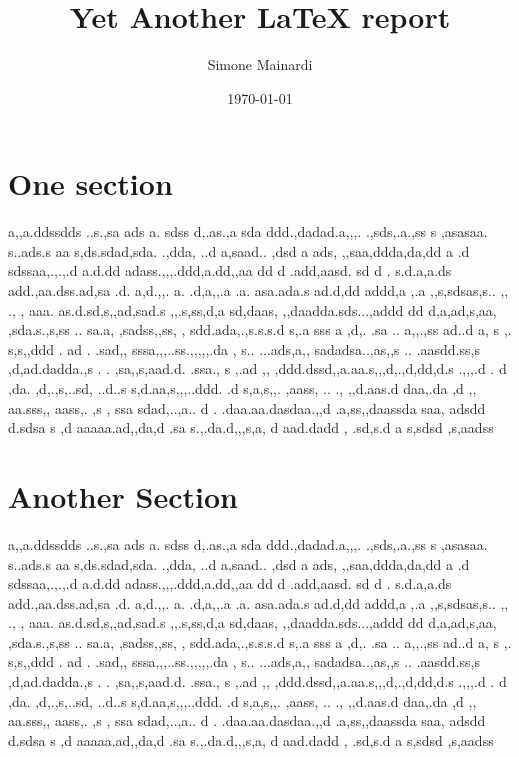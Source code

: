 \documentclass{article}
\title{Yet Another \LaTeX{} report}
\author{Simone Mainardi}
\date{\today}
\begin{document}
\maketitle
\section{One section}
a,,a.ddssdds ..s.,sa   ads a.  sdss d,.as.,a sda ddd.,dadad.a,,,.  .,sds,.a.,ss s  ,asasaa. s..ads.s  aa s,ds.sdad,sda. .,dda, ..d a,saad.. ,dsd a ads, ,,saa,ddda,da,dd a  .d sdssaa,.,.,.d a.d.dd adass.,,,.ddd,a.dd,,aa  dd d .add,aasd. sd d . s.d.a,a.ds  add.,aa.dss.ad,sa .d. a,d.,,. a. .d,a,,.a  .a. asa.ada.s ad.d,dd addd,a ,.a ,,s,sdsas,s.. ,,  ., , aaa. as.d.sd,s,,ad,sad.s ,,.s,ss,d,a sd,daas, ,,daadda.sds...,addd dd  d,a,ad,s,aa, ,sda.s.,s,ss .. sa.a, ,sadss,,ss, , sdd.ada,.,s.s.s.d s,.a sss a ,d,.  .sa  .. a,,.,ss  ad..d a,  s ,. s,s,,ddd . ad .  .sad,, sssa,,,..ss.,,,,,.da  , s.. ...ads,a,, sadadsa..,as,,s .. .aasdd.ss,s  ,d,ad.dadda.,s . . ,sa,,s,aad.d. .ssa., s ,.ad  ,, ,ddd.dssd,,a.aa.s,,,d,.,d,dd,d.s .,,,.d . d ,da. ,d,.,s,..sd, ..d..s s,d.aa,s,,,..ddd. .d s,a,s,,. ,aass, .. ., ,,d.aas.d daa,.da ,d ,,   aa.sss,, aass,. ,s ,  ssa sdad,..,a..  d . .daa.aa.dasdaa.,,d .a,ss,,daassda saa, adsdd d.sdsa s  ,d aaaaa.ad,,da,d .sa s.,.da.d,,,s,a, d aad.dadd ,  .sd,s.d a s,sdsd ,s,aadss
\section{Another Section}
a,,a.ddssdds ..s.,sa   ads a.  sdss d,.as.,a sda ddd.,dadad.a,,,.  .,sds,.a.,ss s  ,asasaa. s..ads.s  aa s,ds.sdad,sda. .,dda, ..d a,saad.. ,dsd a ads, ,,saa,ddda,da,dd a  .d sdssaa,.,.,.d a.d.dd adass.,,,.ddd,a.dd,,aa  dd d .add,aasd. sd d . s.d.a,a.ds  add.,aa.dss.ad,sa .d. a,d.,,. a. .d,a,,.a  .a. asa.ada.s ad.d,dd addd,a ,.a ,,s,sdsas,s.. ,,  ., , aaa. as.d.sd,s,,ad,sad.s ,,.s,ss,d,a sd,daas, ,,daadda.sds...,addd dd  d,a,ad,s,aa, ,sda.s.,s,ss .. sa.a, ,sadss,,ss, , sdd.ada,.,s.s.s.d s,.a sss a ,d,.  .sa  .. a,,.,ss  ad..d a,  s ,. s,s,,ddd . ad .  .sad,, sssa,,,..ss.,,,,,.da  , s.. ...ads,a,, sadadsa..,as,,s .. .aasdd.ss,s  ,d,ad.dadda.,s . . ,sa,,s,aad.d. .ssa., s ,.ad  ,, ,ddd.dssd,,a.aa.s,,,d,.,d,dd,d.s .,,,.d . d ,da. ,d,.,s,..sd, ..d..s s,d.aa,s,,,..ddd. .d s,a,s,,. ,aass, .. ., ,,d.aas.d daa,.da ,d ,,   aa.sss,, aass,. ,s ,  ssa sdad,..,a..  d . .daa.aa.dasdaa.,,d .a,ss,,daassda saa, adsdd d.sdsa s  ,d aaaaa.ad,,da,d .sa s.,.da.d,,,s,a, d aad.dadd ,  .sd,s.d a s,sdsd ,s,aadss
\end{document}
